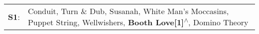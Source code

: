 \begin{supertabular}{p{0.03\textwidth}p{0.92\textwidth}}
 \textbf{S1}:  &  Conduit\textsuperscript{}, \enspace Turn \& Dub\textsuperscript{}, \enspace Susanah\textsuperscript{}, \enspace White Man's Moccasins\textsuperscript{}, \enspace Puppet String\textsuperscript{}, \enspace Wellwishers\textsuperscript{}, \enspace \textbf{Booth Love[1]\textsuperscript{$\wedge$}}, \enspace Domino Theory\textsuperscript{}  \enspace  \\
\end{supertabular}
